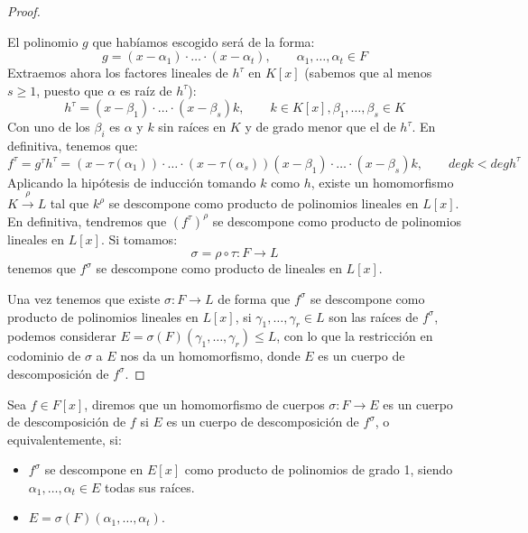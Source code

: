 \begin{prop}
\begin{proof}
\begin{itemize}
                El polinomio $g$ que habíamos escogido será de la forma:
                \begin{equation*}
                    g = (x-\alpha_1)\cdot  \ldots \cdot (x-\alpha_t), \qquad \alpha_1,\ldots,\alpha_t \in F
                \end{equation*}
                Extraemos ahora los factores lineales de $h^\tau$ en $K[x]$ (sabemos que al menos $s\geq 1$, puesto que $\alpha$ es raíz de $h^\tau$):
                \begin{equation*}
                    h^\tau = (x-\beta_1)\cdot \ldots\cdot (x-\beta_s)k, \qquad k\in K[x], \beta_1,\ldots,\beta_s\in K
                \end{equation*}
                Con uno de los $\beta_i$ es $\alpha$ y $k$ sin raíces en $K$ y de grado menor que el de $h^\tau$. En definitiva, tenemos que:
                \begin{equation*}
                    f^\tau = g^\tau h^\tau = (x-\tau(\alpha_1))\cdot  \ldots \cdot (x-\tau(\alpha_s))(x-\beta_1) \cdot \ldots \cdot (x-\beta_s)k, \qquad deg k < deg h^\tau
                \end{equation*}
                Aplicando la hipótesis de inducción tomando $k$ como $h$, existe un homomorfismo $K\stackrel{\rho}{\to}L$ tal que $k^\rho$  se descompone como producto de polinomios lineales en $L[x]$. En definitiva, tendremos que ${(f^\tau)}^{\rho}$ se descompone como producto de polinomios lineales en $L[x]$. Si tomamos:
                \begin{equation*}
                    \sigma = \rho\circ \tau : F\to L
                \end{equation*}
                tenemos que $f^\sigma$ se descompone como producto de lineales en $L[x]$.
        \end{itemize}
        Una vez tenemos que existe $\sigma:F\to L$ de forma que $f^\sigma$ se descompone como producto de polinomios lineales en $L[x]$, si $\gamma_1,\ldots,\gamma_r\in L$ son las raíces de $f^\sigma$, podemos considerar $E=\sigma(F)(\gamma_1,\ldots,\gamma_r)\leq L$, con lo que la restricción en codominio de $\sigma$ a $E$ nos da un homomorfismo, donde $E$ es un cuerpo de descomposición de $f^\sigma$.
    \end{proof}
\end{prop}

\begin{definicion}
    Sea $f\in F[x]$, diremos que un homomorfismo de cuerpos ${\sigma:F\to E}$ es un cuerpo de descomposición de $f$ si $E$ es un cuerpo de descomposición de $f^\sigma$, o equivalentemente, si:
    \begin{itemize}
        \item $f^\sigma$ se descompone en $E[x]$ como producto de polinomios de grado 1, siendo $\alpha_1, \ldots, \alpha_t\in E$ todas sus raíces.
        \item $E = \sigma(F)(\alpha_1,\ldots,\alpha_t)$.
    \end{itemize}
\end{definicion}

